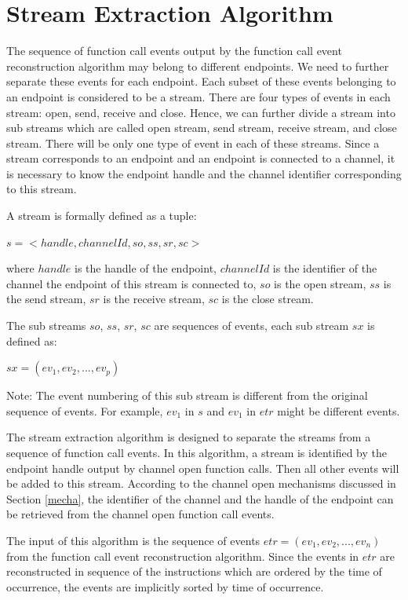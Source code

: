 \section{Stream Extraction Algorithm}
The sequence of function call events output by the function call event reconstruction algorithm may belong to different endpoints. We need to further separate these events for each endpoint. Each subset of these events belonging to an endpoint is considered to be a stream. There are four types of events in each stream: open, send, receive and close. Hence, we can further divide a stream into sub streams which are called open stream, send stream, receive stream, and close stream. There will be only one type of event in each of these streams. Since a stream corresponds to an endpoint and an endpoint is connected to a channel, it is necessary to know the endpoint handle and the channel identifier corresponding to this stream. 

A stream is formally defined as a tuple:

$s = <handle, channelId, so, ss, sr, sc>$

where $handle$ is the handle of the endpoint, $channelId$ is the identifier of the channel the endpoint of this stream is connected to, $so$ is the open stream, $ss$ is the send stream, $sr$ is the receive stream, $sc$ is the close stream. 

The sub streams $so$, $ss$, $sr$, $sc$ are sequences of events, each sub stream $sx$ is defined as:

$sx = (ev_1, ev_2, ..., ev_p)$

Note: The event numbering of this sub stream is different from the original sequence of events. For example, $ev_1$ in $s$ and $ev_1$ in $etr$ might be different events.

The stream extraction algorithm is designed to separate the streams from a sequence of function call events. In this algorithm, a stream is identified by the endpoint handle output by channel open function calls. Then all other events will be added to this stream.  According to the channel open mechanisms discussed in Section \ref{mecha}, the identifier of the channel and the handle of the endpoint can be retrieved from the channel open function call events.

The input of this algorithm is the sequence of events $etr = (ev_1, ev_2, ..., ev_n)$ from the function call event reconstruction algorithm. Since the events in $etr$ are reconstructed in sequence of the instructions which are ordered by the time of occurrence, the events are implicitly sorted by time of occurrence. 

